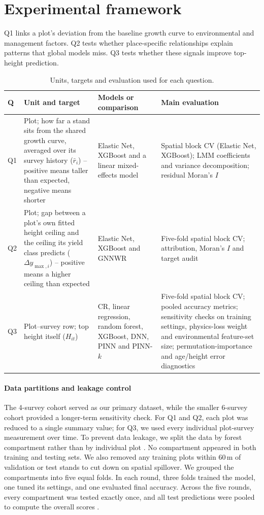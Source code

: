 \documentclass[logo,msc,ai]{infthesis}           %
\begin{document}
\section{Experimental framework}
Q1 links a plot's deviation from the baseline growth curve to environmental and management factors. Q2 tests whether place-specific relationships explain patterns that global models miss. Q3 tests whether these signals improve top-height prediction. 
\begin{table}[!ht]
\centering
\footnotesize
\renewcommand{\arraystretch}{1.2}
\begin{tabularx}{\linewidth}{@{} l >{\raggedright\arraybackslash}X >{\raggedright\arraybackslash}X >{\raggedright\arraybackslash}X @{}}
\toprule
Q & Unit and target & Models or comparison & Main evaluation \\
\midrule
Q1 & Plot; how far a stand sits from the shared growth curve, averaged over its survey history ($\bar r_i$) -- positive means taller than expected, negative means shorter & Elastic Net, XGBoost and a linear
mixed-effects model & Spatial block CV (Elastic Net, XGBoost); LMM coefficients and variance decomposition; residual Moran's $I$ \\
Q2 & Plot; gap between a plot's own fitted height ceiling and the ceiling its yield class predicts ($\Delta y_{\max,i}$) -- positive means a higher ceiling than expected & Elastic Net, XGBoost
and GNNWR & Five-fold spatial block CV; attribution, Moran's $I$ and target audit \\
Q3 & Plot--survey row; top height itself ($H_{it}$) & CR, linear regression, random forest, XGBoost, DNN, PINN and PINN-$k$
& Five-fold spatial block CV; pooled accuracy metrics; sensitivity checks on training
settings, physics-loss weight and environmental feature-set size; permutation-importance
and age/height error diagnostics \\
\bottomrule
\end{tabularx}
\caption{\small{Units, targets and evaluation used for each question.}}
\label{tab:rq-framework}
\end{table}


\paragraph*{Data partitions and leakage control}
The 4-survey cohort served as our primary dataset, while the smaller 6-survey cohort provided a longer-term sensitivity check. For Q1 and Q2, each plot was reduced to a single summary value; for Q3, we used every individual plot-survey measurement over time. To prevent data leakage, we split the data by forest compartment rather than by individual plot \cite{roberts2017Cross_C5_EVAL}. No compartment appeared in both training and testing sets. We also removed any training plots within 60\,m of validation or test stands to cut down on spatial spillover. We grouped the compartments into five equal folds. In each round, three folds trained the model, one tuned its settings, and one evaluated final accuracy. Across the five rounds, every compartment was tested exactly once, and all test predictions were pooled to compute the overall scores \cite{ploton2020Spatial_C5_EVAL}.
\end{document}
